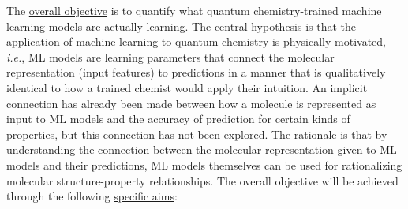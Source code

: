 \documentclass[12pt]{article}
\begin{document}
The \uline{overall objective} is to quantify what quantum chemistry-trained machine learning models are actually learning. The \uline{central hypothesis} is that the application of machine learning to quantum chemistry is physically motivated, \emph{i.e.}, ML models are learning parameters that connect the molecular representation (input features) to predictions in a manner that is qualitatively identical to how a trained chemist would apply their intuition. An implicit connection has already been made \cite{2017arXiv170205532F} between how a molecule is represented as input to ML models and the accuracy of prediction for certain kinds of properties, but this connection has not been explored. The \uline{rationale} is that by understanding the connection between the molecular representation given to ML models and their predictions, ML models themselves can be used for rationalizing molecular structure-property relationships. The overall objective will be achieved through the following \uline{specific aims}:
\end{document}
